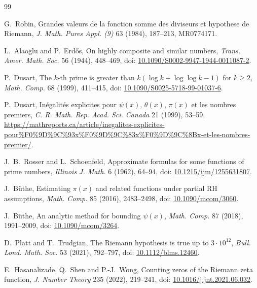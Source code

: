 \documentclass[11pt,a4paper]{article}
\numberwithin{equation}{section}
\theoremstyle{definition}
\begin{document}
\begin{thebibliography}{99}

G.~Robin,
\newblock Grandes valeurs de la fonction somme des diviseurs et hypothese de
Riemann,
\newblock \emph{J. Math. Pures Appl. (9)} 63 (1984), 187--213,
\newblock MR0774171.

L.~Alaoglu and P.~Erd\H{o}s,
\newblock On highly composite and similar numbers,
\newblock \emph{Trans. Amer. Math. Soc.} 56 (1944), 448--469,
\newblock doi:
\href{https://doi.org/10.1090/S0002-9947-1944-0011087-2}
{10.1090/S0002-9947-1944-0011087-2}.

P.~Dusart,
\newblock The \(k\)-th prime is greater than
\(k(\log k+\log\log k-1)\) for \(k\ge2\),
\newblock \emph{Math. Comp.} 68 (1999), 411--415,
\newblock doi:
\href{https://doi.org/10.1090/S0025-5718-99-01037-6}
{10.1090/S0025-5718-99-01037-6}.

P.~Dusart,
\newblock In\'egalit\'es explicites pour \(\psi(x)\), \(\theta(x)\),
\(\pi(x)\) et les nombres premiers,
\newblock \emph{C. R. Math. Rep. Acad. Sci. Canada} 21 (1999), 53--59,
\newblock \url{https://mathreports.ca/article/inegalites-explicites-pour%F0%9D%9C%93x%F0%9D%9C%83x%F0%9D%9C%8Bx-et-les-nombres-premier/}.

J.~B.~Rosser and L.~Schoenfeld,
\newblock Approximate formulas for some functions of prime numbers,
\newblock \emph{Illinois J. Math.} 6 (1962), 64--94,
\newblock doi:
\href{https://doi.org/10.1215/ijm/1255631807}
{10.1215/ijm/1255631807}.

J.~B\"uthe,
\newblock Estimating \(\pi(x)\) and related functions under partial RH
assumptions,
\newblock \emph{Math. Comp.} 85 (2016), 2483--2498,
\newblock doi:
\href{https://doi.org/10.1090/mcom/3060}{10.1090/mcom/3060}.

J.~B\"uthe,
\newblock An analytic method for bounding \(\psi(x)\),
\newblock \emph{Math. Comp.} 87 (2018), 1991--2009,
\newblock doi:
\href{https://doi.org/10.1090/mcom/3264}{10.1090/mcom/3264}.

D.~Platt and T.~Trudgian,
\newblock The Riemann hypothesis is true up to \(3\cdot10^{12}\),
\newblock \emph{Bull. Lond. Math. Soc.} 53 (2021), 792--797,
\newblock doi:
\href{https://doi.org/10.1112/blms.12460}{10.1112/blms.12460}.

E.~Hasanalizade, Q.~Shen and P.-J.~Wong,
\newblock Counting zeros of the Riemann zeta function,
\newblock \emph{J. Number Theory} 235 (2022), 219--241,
\newblock doi:
\href{https://doi.org/10.1016/j.jnt.2021.06.032}
{10.1016/j.jnt.2021.06.032}.


\end{thebibliography}
\end{document}
